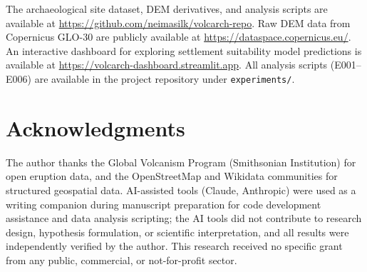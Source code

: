 \documentclass[12pt,letterpaper]{article}
\begin{document}
The archaeological site dataset, DEM derivatives, and analysis scripts are available at \url{https://github.com/neimasilk/volcarch-repo}. Raw DEM data from Copernicus GLO-30 are publicly available at \url{https://dataspace.copernicus.eu/}. An interactive dashboard for exploring settlement suitability model predictions is available at \url{https://volcarch-dashboard.streamlit.app}. All analysis scripts (E001--E006) are available in the project repository under \texttt{experiments/}.

\section*{Acknowledgments}

The author thanks the Global Volcanism Program (Smithsonian Institution) for open eruption data, and the OpenStreetMap and Wikidata communities for structured geospatial data. AI-assisted tools (Claude, Anthropic) were used as a writing companion during manuscript preparation for code development assistance and data analysis scripting; the AI tools did not contribute to research design, hypothesis formulation, or scientific interpretation, and all results were independently verified by the author. This research received no specific grant from any public, commercial, or not-for-profit sector.



\end{document}
